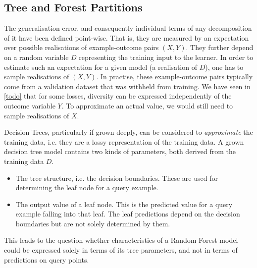 \documentclass[../main.tex]{subfiles}
\begin{document}




\subsection{Tree and Forest Partitions}
\label{sec:tree-and-forest-partitions}

The generalisation error, and consequently individual terms of any decomposition of it have been defined point-wise. That is, they are measured by an expectation over possible realisations of example-outcome pairs $(X,Y)$. They further depend on a random variable $D$ representing the training input to the learner. In order to estimate such an expectation for a given model (a realisation of $D$), one has to sample realisations of $(X,Y)$. In practise, these example-outcome pairs typically come from a validation dataset that was withheld from training.
We have seen in \ref{todo} that for some losses, diversity can be expressed independently of the outcome variable $Y$. 
To approximate an actual value, we would still need to sample realisations of $X$.

Decision Trees, particularly if grown deeply, can be considered to \textit{approximate} the training data, i.e. they are a lossy representation of the training data. A grown decision tree model contains two kinds of parameters, both derived from the training data $D$.
\begin{itemize}
\item The tree structure, i.e. the decision boundaries. These are used for determining the leaf node for a query example.
\item The output value of a leaf node. This is the predicted value for a query example falling into that leaf. The leaf predictions depend on the decision boundaries but are not solely determined by them. 
\end{itemize}
This leads to the question whether characteristics of a Random Forest model could be expressed solely in terms of its tree parameters, and not in terms of predictions on query points.
\end{document}
